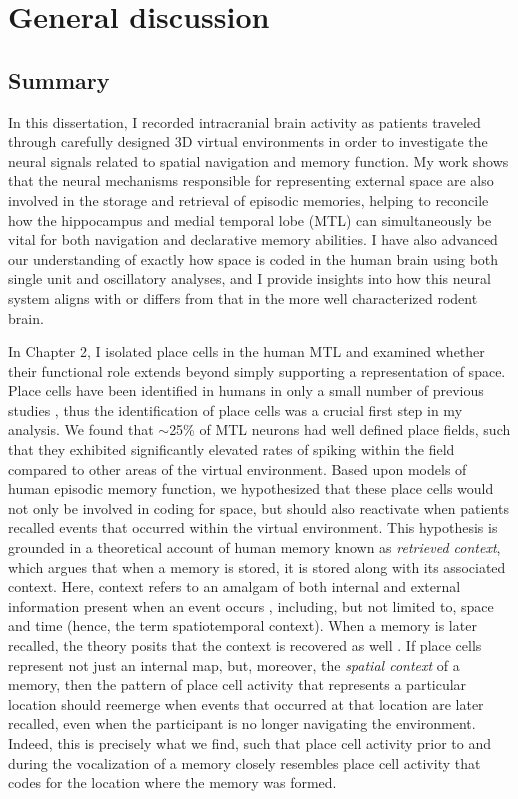 \chapter{General discussion}

\section{Summary}

In this dissertation, I recorded intracranial brain activity as patients traveled through carefully designed 3D virtual environments in order to investigate the neural signals related to spatial navigation and memory function. My work shows that the neural mechanisms responsible for representing external space are also involved in the storage and retrieval of episodic memories, helping to reconcile how the hippocampus and medial temporal lobe (MTL) can simultaneously be vital for both navigation and declarative memory abilities. I have also advanced our understanding of exactly how space is coded in the human brain using both single unit and oscillatory analyses, and I provide insights into how this neural system aligns with or differs from that in the more well characterized rodent brain. 

In Chapter 2, I isolated place cells in the human MTL and examined whether their functional role extends beyond simply supporting a representation of space. Place cells have been identified in humans in only a small number of previous studies \citep{EkstEtal03,JacoEtal10}, thus the identification of place cells was a crucial first step in my analysis. We found that $\sim$25\% of MTL neurons had well defined place fields, such that they exhibited significantly elevated rates of spiking within the field compared to other areas of the virtual environment. Based upon models of human episodic memory function, we hypothesized that these place cells would not only be involved in coding for space, but should also reactivate when patients recalled events that occurred within the virtual environment. This hypothesis is grounded in a theoretical account of human memory known as \textit{retrieved context}, which argues that when a memory is stored, it is stored along with its associated context. Here, context refers to an amalgam of both internal and external information present when an event occurs \citep{McGe42,Bowe72}, including, but not limited to, space and time (hence, the term spatiotemporal context). When a memory is later recalled, the theory posits that the context is recovered as well \citep{HowaKaha02a,PolyEtalTulv,LohnKaha13a}. If place cells represent not just an internal map, but, moreover, the \textit{spatial context} of a memory, then the pattern of place cell activity that represents a particular location should reemerge when events that occurred at that location are later recalled, even when the participant is no longer navigating the environment. Indeed, this is precisely what we find, such that place cell activity prior to and during the vocalization of a memory closely resembles place cell activity that codes for the location where the memory was formed.

